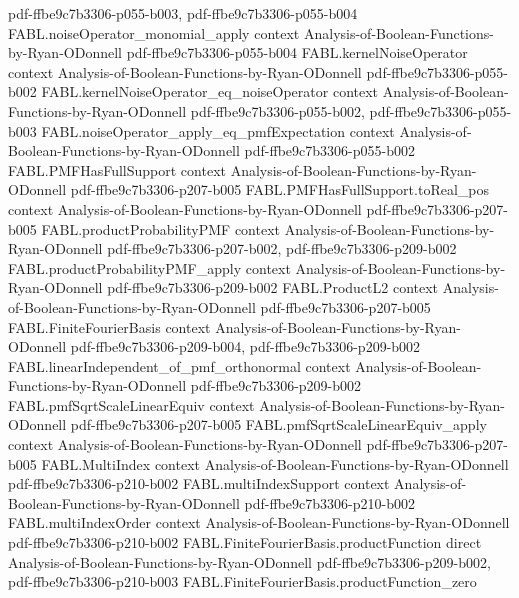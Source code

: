 \begin{theorem}
  {pdf-ffbe9c7b3306-p055-b003,
    pdf-ffbe9c7b3306-p055-b004}
\proofstep
  {FABL.noiseOperator_monomial_apply}
  {context}
  {Analysis-of-Boolean-Functions-by-Ryan-ODonnell}
  {pdf-ffbe9c7b3306-p055-b004}
\proofstep
  {FABL.kernelNoiseOperator}
  {context}
  {Analysis-of-Boolean-Functions-by-Ryan-ODonnell}
  {pdf-ffbe9c7b3306-p055-b002}
\proofstep
  {FABL.kernelNoiseOperator_eq_noiseOperator}
  {context}
  {Analysis-of-Boolean-Functions-by-Ryan-ODonnell}
  {pdf-ffbe9c7b3306-p055-b002,
    pdf-ffbe9c7b3306-p055-b003}
\proofstep
  {FABL.noiseOperator_apply_eq_pmfExpectation}
  {context}
  {Analysis-of-Boolean-Functions-by-Ryan-ODonnell}
  {pdf-ffbe9c7b3306-p055-b002}
\proofstep
  {FABL.PMFHasFullSupport}
  {context}
  {Analysis-of-Boolean-Functions-by-Ryan-ODonnell}
  {pdf-ffbe9c7b3306-p207-b005}
\proofstep
  {FABL.PMFHasFullSupport.toReal_pos}
  {context}
  {Analysis-of-Boolean-Functions-by-Ryan-ODonnell}
  {pdf-ffbe9c7b3306-p207-b005}
\proofstep
  {FABL.productProbabilityPMF}
  {context}
  {Analysis-of-Boolean-Functions-by-Ryan-ODonnell}
  {pdf-ffbe9c7b3306-p207-b002,
    pdf-ffbe9c7b3306-p209-b002}
\proofstep
  {FABL.productProbabilityPMF_apply}
  {context}
  {Analysis-of-Boolean-Functions-by-Ryan-ODonnell}
  {pdf-ffbe9c7b3306-p209-b002}
\proofstep
  {FABL.ProductL2}
  {context}
  {Analysis-of-Boolean-Functions-by-Ryan-ODonnell}
  {pdf-ffbe9c7b3306-p207-b005}
\proofstep
  {FABL.FiniteFourierBasis}
  {context}
  {Analysis-of-Boolean-Functions-by-Ryan-ODonnell}
  {pdf-ffbe9c7b3306-p209-b004,
    pdf-ffbe9c7b3306-p209-b002}
\proofstep
  {FABL.linearIndependent_of_pmf_orthonormal}
  {context}
  {Analysis-of-Boolean-Functions-by-Ryan-ODonnell}
  {pdf-ffbe9c7b3306-p209-b002}
\proofstep
  {FABL.pmfSqrtScaleLinearEquiv}
  {context}
  {Analysis-of-Boolean-Functions-by-Ryan-ODonnell}
  {pdf-ffbe9c7b3306-p207-b005}
\proofstep
  {FABL.pmfSqrtScaleLinearEquiv_apply}
  {context}
  {Analysis-of-Boolean-Functions-by-Ryan-ODonnell}
  {pdf-ffbe9c7b3306-p207-b005}
\proofstep
  {FABL.MultiIndex}
  {context}
  {Analysis-of-Boolean-Functions-by-Ryan-ODonnell}
  {pdf-ffbe9c7b3306-p210-b002}
\proofstep
  {FABL.multiIndexSupport}
  {context}
  {Analysis-of-Boolean-Functions-by-Ryan-ODonnell}
  {pdf-ffbe9c7b3306-p210-b002}
\proofstep
  {FABL.multiIndexOrder}
  {context}
  {Analysis-of-Boolean-Functions-by-Ryan-ODonnell}
  {pdf-ffbe9c7b3306-p210-b002}
\proofstep
  {FABL.FiniteFourierBasis.productFunction}
  {direct}
  {Analysis-of-Boolean-Functions-by-Ryan-ODonnell}
  {pdf-ffbe9c7b3306-p209-b002,
    pdf-ffbe9c7b3306-p210-b003}
\proofstep
  {FABL.FiniteFourierBasis.productFunction_zero}

\end{theorem}
